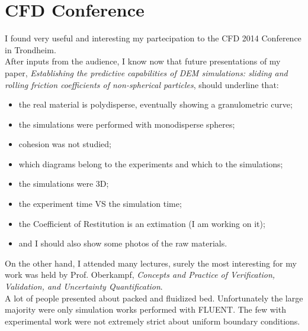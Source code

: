 
\section{CFD Conference}
\label{sec:cfdconference}

I found very useful and interesting my partecipation to the CFD 2014 Conference in Trondheim.\\
After inputs from the audience, I know now that future presentations of my paper, \textit{Establishing the predictive capabilities of DEM simulations: sliding and rolling friction coefficients of non-spherical particles}, should underline that: 
\begin{itemize}
\item{the real material is polydisperse, eventually showing a granulometric curve;}
\item{the simulations were performed with monodisperse spheres;}
\item{cohesion was not studied;}
\item{which diagrams belong to the experiments and which to the simulations;}
\item{the simulations were 3D;}
\item{the experiment time VS the simulation time;}
\item{the Coefficient of Restitution is an extimation (I am working on it);}
\item{and I should also show some photos of the raw materials.}
\end{itemize}

On the other hand, I attended many lectures, surely the most interesting for my work was held by Prof. Oberkampf, \textit{Concepts and Practice of Verification, Validation, and Uncertainty Quantification}. \\
A lot of people presented about packed and fluidized bed. Unfortunately the large majority were only simulation works performed with FLUENT. The few with experimental work were not extremely strict about uniform boundary conditions.\\